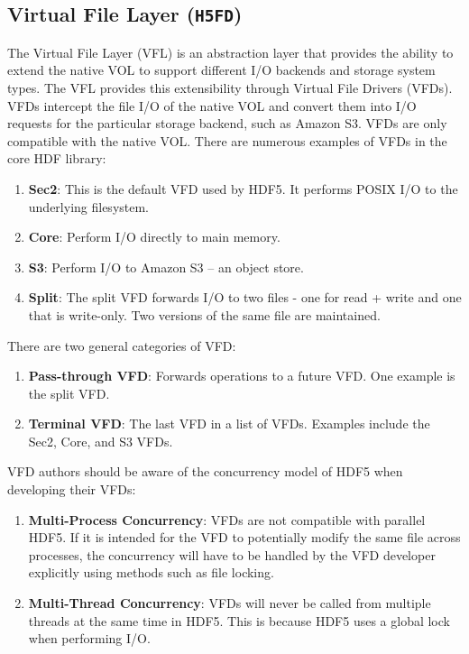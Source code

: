 \subsection{Virtual File Layer (\texttt{H5FD})}\label{ref:vfl}



The Virtual File Layer (VFL) is an abstraction layer that provides the ability to extend the native VOL to support different I/O backends and storage system types. The VFL provides this extensibility through Virtual File Drivers (VFDs). VFDs intercept the file I/O of the native VOL and convert them into I/O requests for the particular storage backend, such as Amazon S3. VFDs are only compatible with the native VOL. There are numerous examples of VFDs in the core HDF library:
\begin{enumerate}
    \item \textbf{Sec2}: This is the default VFD used by HDF5. It performs POSIX I/O to the underlying filesystem.
    \item \textbf{Core}: Perform I/O directly to main memory.
    \item \textbf{S3}: Perform I/O to Amazon S3 -- an object store.
    \item \textbf{Split}: The split VFD forwards I/O to two files - one for read + write and one that is write-only. Two versions of the same file are maintained.
\end{enumerate}

There are two general categories of VFD:
\begin{enumerate}
    \item \textbf{Pass-through VFD}: Forwards operations to a future VFD. One example is the split VFD.
    \item \textbf{Terminal VFD}: The last VFD in a list of VFDs. Examples include the Sec2, Core, and S3 VFDs.
\end{enumerate}

VFD authors should be aware of the concurrency model of HDF5 when developing their VFDs:
\begin{enumerate}
    \item \textbf{Multi-Process Concurrency}: VFDs are not compatible with parallel HDF5. If it is intended for the VFD to potentially modify the same file across processes, the concurrency will have to be handled by the VFD developer explicitly using methods such as file locking.
    \item \textbf{Multi-Thread Concurrency}: VFDs will never be called from multiple threads at the same time in HDF5. This is because HDF5 uses a global lock when performing I/O.
\end{enumerate}


